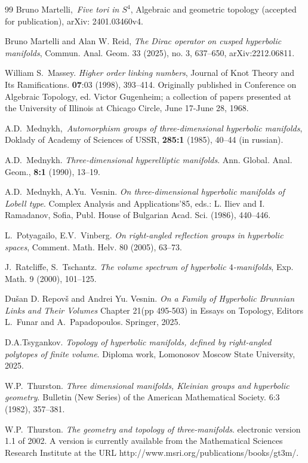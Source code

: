 \documentclass[12pt]{amsart}
\theoremstyle{definition}
\theoremstyle{remark}
\begin{document}
\begin{thebibliography}{99}
Bruno Martelli,\, 
\emph{Five tori in $S^4$},
Algebraic and geometric topology (accepted for publication), arXiv: 2401.03460v4.

Bruno Martelli and Alan W. Reid, 
\emph{The Dirac operator on cusped hyperbolic manifolds},
Commun. Anal. Geom. 33 (2025), no. 3, 637--650,  arXiv:2212.06811.

William S.~Massey.
\emph{Higher order linking numbers},
Journal of Knot Theory and Its Ramifications. {\bf 07}:03 (1998), 393--414.
Originally published in Conference on Algebraic Topology, ed. Victor Gugenheim; a collection of papers presented at the University of Illinois at Chicago Circle, June 17-June 28, 1968. 

A.D.~Mednykh,\,
\emph{Automorphism groups of three-dimensional hyperbolic manifolds}, 
Doklady of Academy of Sciences of USSR, {\bf 285:1} (1985), 40--44 (in russian). 

A.D.~Mednykh.
\emph{Three-dimensional hyperelliptic manifolds}.
Ann. Global. Anal. Geom., {\bf 8:1} (1990), 13--19.

A.D.~Mednykh, A.Yu.~Vesnin.
\emph{On three-dimensional hyperbolic manifolds of Lobell type}.
Complex Analysis and Applications'85, eds.: L. Iliev and I. Ramadanov, Sofia, Publ. House
of Bulgarian Acad. Sci. (1986), 440--446.

L.~Potyagailo, E.V.~Vinberg.
\emph{On right-angled reflection groups in hyperbolic spaces},
Comment. Math. Helv. 80 (2005), 63--73.

J.~Ratcliffe,  S.~Tschantz.
\emph{The volume spectrum of hyperbolic $4$-manifolds}, 
Exp. Math. 9 (2000), 101--125.

Du\v{s}an D. Repov\v{s} and Andrei Yu. Vesnin.
\emph{On a Family of Hyperbolic Brunnian Links and Their Volumes}
Chapter 21(pp 495-503) in Essays on Topology, Editors L.~Funar and A.~Papadopoulos. Springer, 2025.

D.A.Tsygankov. 
\emph{Topology of hyperbolic manifolds, defined by right-angled polytopes of finite volume}.
Diploma work, Lomonosov Moscow State University, 2025.

W.P.~Thurston.
\emph{Three dimensional manifolds, Kleinian groups and hyperbolic geometry}. 
Bulletin (New Series) of the American Mathematical Society. 6:3 (1982), 357--381. 

W.P.~Thurston.
\emph{The geometry and topology of three-manifolds}. 
electronic version 1.1 of 2002. A version is currently available from the Mathematical Sciences Research
Institute at the URL http://www.msri.org/publications/books/gt3m/.


\end{thebibliography}
\end{document}
